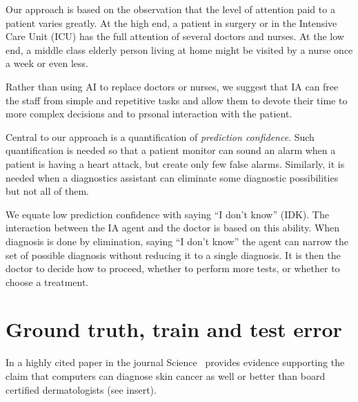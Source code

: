 \documentclass[11pt]{pnas-new}
\begin{document}
Our approach is based on the observation that the level of attention
paid to a patient varies greatly. At the high end, a patient in
surgery or in the Intensive Care Unit (ICU) has the full attention of
several doctors and nurses. At the low end, a middle class elderly
person living at home might be visited by a nurse once a week or even less.

Rather than using AI to replace doctors or nurses, we suggest that IA can free
the staff from simple and repetitive tasks and allow them to devote
their time to more complex decisions and to prsonal interaction with
the patient.

Central to our approach is a quantification of {\em prediction confidence}. Such
quantification is needed so that a patient monitor can sound an alarm
when a patient is having a heart attack, but create only few false
alarms. Similarly, it is needed when a diagnostics assistant can
eliminate some diagnostic possibilities but not all of them.

We equate low prediction confidence with saying ``I don't know'' (IDK). The
interaction between the IA agent and the doctor is based on this
ability. When diagnosis is done by elimination, saying ``I don't
know'' the agent can narrow the set of possible diagnosis without
reducing it to a single diagnosis. It is then the doctor to decide how
to proceed, whether to perform more tests, or whether to choose a treatment.


\section{Ground truth, train and test error}
\label{sec:ground-truth}

In a highly cited paper in the journal
Science~\cite{esteva2017dermatologist} provides evidence supporting
the claim that computers can diagnose skin cancer as well or better than board
certified dermatologists (see insert).
  
\end{document}
